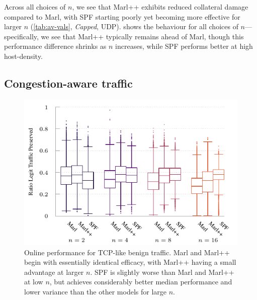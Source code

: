 \documentclass[conference, a4paper, 10pt, times]{IEEEtran}
\begin{document}
Across all choices of $n$, we see that Marl++ exhibits reduced collateral damage compared to Marl, with SPF starting poorly yet becoming more effective for larger $n$ (\cref{tab:av-vals}, \emph{Capped}, UDP).
 shows the behaviour for all choices of $n$---specifically, we see that Marl++ typically remains ahead of Marl, though this performance difference shrinks as $n$ increases, while SPF performs better at high host-density.

\subsection{Congestion-aware traffic}
%	
\begin{figure}
	\centering
	\includegraphics[width=0.95\linewidth]{../plots/tcp-box}
	
	\caption{
		Online performance for TCP-like benign traffic.
		Marl and Marl++ begin with essentially identical efficacy, with Marl++ having a small advantage at larger $n$.
		SPF is slightly worse than Marl and Marl++ at low $n$, but achieves considerably better median performance and lower variance than the other models for large $n$.
		\label{fig:tcp-box}
	}
\end{figure}
\end{document}

